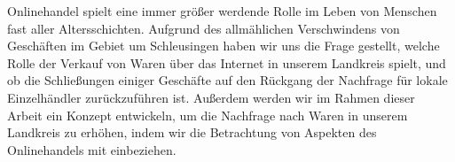 Onlinehandel spielt eine immer größer werdende Rolle im Leben von Menschen fast aller Altersschichten. Aufgrund des allmählichen Verschwindens von Geschäften im Gebiet um Schleusingen haben wir uns die Frage gestellt, welche Rolle der Verkauf von Waren über das Internet in unserem Landkreis spielt, und ob die Schließungen einiger Geschäfte auf den Rückgang der Nachfrage für lokale Einzelhändler zurückzuführen ist.
Außerdem werden wir im Rahmen dieser Arbeit ein Konzept entwickeln, um die Nachfrage nach Waren in unserem Landkreis zu erhöhen, indem wir die Betrachtung von Aspekten des Onlinehandels mit einbeziehen.